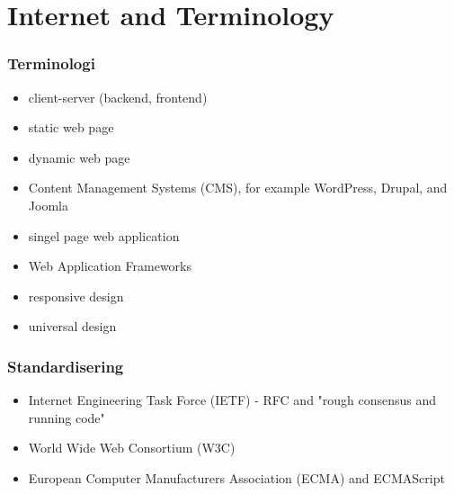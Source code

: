 \section{Internet and Terminology}

\begin{frame}[fragile]
\frametitle{Terminologi}
\color{structure}
\begin{itemize}\color{structure}
  \item client-server (backend, frontend)
  \item static web page
  \item dynamic web page
  \item Content Management Systems (CMS), for example WordPress, Drupal, and Joomla
  \item singel page web application
  \item Web Application Frameworks
  \item responsive design
  \item universal design
\end{itemize}
\end{frame}

\begin{frame}[fragile]
\frametitle{Standardisering}
\color{structure}
\begin{itemize}\color{structure}
  \item Internet Engineering Task Force (IETF) - RFC and "rough consensus and running code"
  \item World Wide Web Consortium (W3C)
  \item European Computer Manufacturers Association (ECMA) and ECMAScript
\end{itemize}
\end{frame}
